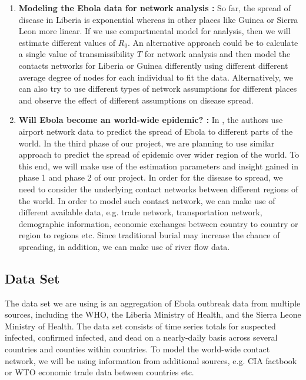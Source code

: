 \documentclass[12pt, journal,onecolumn]{IEEEtran}
\begin{document}
\begin{enumerate}
\item \textbf{Modeling the Ebola data for network analysis : } So far, the spread of disease in Liberia is exponential whereas in other places like Guinea or Sierra Leon more linear. If we use compartmental model for analysis, then we will estimate different values of $R_0$. An alternative approach could be to calculate a single value of transmissibility $T$ for network analysis and then model the contacts networks for Liberia or Guinea differently using different different average degree of nodes for each individual to fit the data. Alternatively, we can also try to use different types of network assumptions for different places and observe the effect of different assumptions on disease spread.

\item \textbf{Will Ebola become an world-wide epidemic? :} In \cite{gomes2014assessing}, the authors use airport network data to predict the spread of Ebola to different parts of the world. In the third phase of our project, we are planning to use similar approach to predict the spread of epidemic over wider region of the world. To this end, we will make use of the estimation parameters and insight gained in phase 1 and phase 2 of our project. In order for the disease to spread, we need to consider the underlying contact networks between different regions of the world. In order to model such contact network, we can make use of different available data, e.g. trade network, transportation network, demographic information, economic exchanges between country to country or region to regions etc. Since traditional burial may increase the chance of spreading, in addition, we can make use of river flow data.




\end{enumerate}

\subsection{Data Set}

The data set we are using \citep{cmriversdata} is an aggregation of Ebola outbreak data from
multiple sources, including the WHO, the Liberia Ministry of Health, and the Sierra Leone Ministry
of Health. The data set consists of time series totals for suspected infected, confirmed infected,
and dead on a nearly-daily basis across several countries and counties within countries. To model the world-wide contact network, we will be using information from additional sources, e.g. CIA factbook or WTO economic trade data between countries etc.
\end{document}
